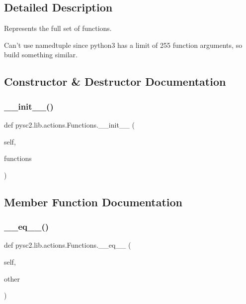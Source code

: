 \subsection{Detailed Description}
\begin{DoxyVerb}Represents the full set of functions.

Can't use namedtuple since python3 has a limit of 255 function arguments, so
build something similar.
\end{DoxyVerb}
 

\subsection{Constructor \& Destructor Documentation}
\mbox{\label{classpysc2_1_1lib_1_1actions_1_1_functions_aed31349597035050c81dcd25e5a4e9db}} 
\subsubsection{\texorpdfstring{\+\_\+\+\_\+init\+\_\+\+\_\+()}{\_\_init\_\_()}}
{\footnotesize\ttfamily def pysc2.\+lib.\+actions.\+Functions.\+\_\+\+\_\+init\+\_\+\+\_\+ (\begin{DoxyParamCaption}\item[{}]{self,  }\item[{}]{functions }\end{DoxyParamCaption})}



\subsection{Member Function Documentation}
\mbox{\label{classpysc2_1_1lib_1_1actions_1_1_functions_a44e72099c126871d34471a673b9d23db}} 
\subsubsection{\texorpdfstring{\+\_\+\+\_\+eq\+\_\+\+\_\+()}{\_\_eq\_\_()}}
{\footnotesize\ttfamily def pysc2.\+lib.\+actions.\+Functions.\+\_\+\+\_\+eq\+\_\+\+\_\+ (\begin{DoxyParamCaption}\item[{}]{self,  }\item[{}]{other }\end{DoxyParamCaption})}

